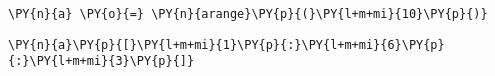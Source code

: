 {\par%
\vspace{-1\baselineskip}%
}%
\begin{notebookcell}[60]%
\begin{addmargin}[\cellleftmargin]{0em}%
{\smaller%
\par%
%
\vspace{-1\smallerfontscale}%
\begin{Verbatim}[commandchars=\\\{\}]
\PY{n}{a} \PY{o}{=} \PY{n}{arange}\PY{p}{(}\PY{l+m+mi}{10}\PY{p}{)}
\end{Verbatim}
%
\par%
\vspace{-1\smallerfontscale}}%
\end{addmargin}
\end{notebookcell}



{\par%
\vspace{-1\baselineskip}%
}%
\begin{notebookcell}[61]%
\begin{addmargin}[\cellleftmargin]{0em}%
{\smaller%
\par%
%
\vspace{-1\smallerfontscale}%
\begin{Verbatim}[commandchars=\\\{\}]
\PY{n}{a}\PY{p}{[}\PY{l+m+mi}{1}\PY{p}{:}\PY{l+m+mi}{6}\PY{p}{:}\PY{l+m+mi}{3}\PY{p}{]}
\end{Verbatim}
%
\par%
\vspace{-1\smallerfontscale}}%
\end{addmargin}
\end{notebookcell}

\par\vspace{1\smallerfontscale}%
    
